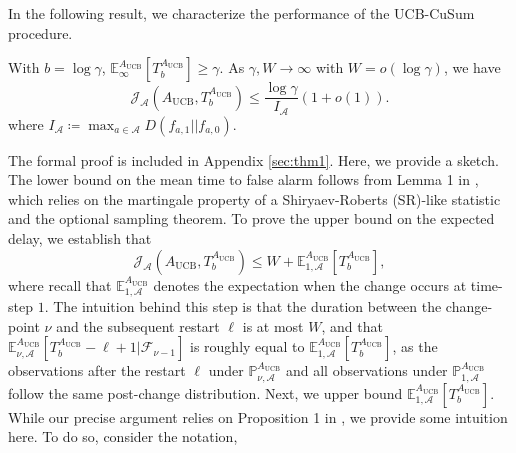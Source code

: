 \documentclass[letterpaper, 10 pt, conference]{ieeeconf}  %
\newcommand{\lp}{\left(}
\newcommand{\rp}{\right)}
\newcommand{\lb}{\left[}
\newcommand{\rb}{\right]}
\newcommand{\mcal}{\mathcal}
\newcommand{\mrm}{\mathrm}
\newcommand{\mbb}{\mathbb}
\newcommand{\E}{\mathbb{E}}
\begin{document}
In the following result, we characterize the performance of the UCB-CuSum procedure.
%
\begin{theorem}\label{thm:UCB_CuSum_opt}
With $b = \log \gamma$, $\E_{\infty}^{A_{\mrm{UCB}}} \lb T_{b}^{A_{\mrm{UCB}}} \rb \geq \gamma$. As $\gamma, W \to \infty$ with $W = o\lp \log \gamma \rp$, we have
%
\begin{equation}\label{eq:thm_WADD} \mcal{J}_{\mcal{A}} \!\lp \!A_{\mrm{UCB}}, T_{b}^{A_{\mrm{UCB}}} \!\rp \leq \frac{\log \gamma}{I_{\mcal{A}}} \lp 1 + o \lp 1\rp \rp.
\end{equation}
where $I_{\mcal{A}} \coloneqq \max_{a \in \mcal{A}} D\lp f_{a,1} || f_{a, 0} \rp$.
\end{theorem}
%
The formal proof is included in Appendix \ref{sec:thm1}. Here, we provide a sketch. 
The lower bound on the mean time to false alarm follows from Lemma 1 in \cite{veeravalli2024quickest}, which relies on the martingale property of a Shiryaev-Roberts (SR)-like statistic and the optional sampling theorem.
To prove the upper bound on the expected delay, we establish that 
%
\begin{equation}
    \mcal{J}_{\mcal{A}} \lp A_{\mrm{UCB}}, T_{b}^{A_{\mrm{UCB}}} \rp \leq W + \E_{1,\mcal{A}}^{A_{\mrm{UCB}}} \lb T_{b}^{A_{\mrm{UCB}}} \rb,
\end{equation}
%
where recall that $\E_{1,\mcal{A}}^{A_{\mrm{UCB}}}$ denotes the expectation when the change occurs at time-step $1$.
The intuition behind this step is that the duration between the change-point $\nu$ and the subsequent restart $\ell$ is at most $W$, and that $\E_{\nu,\mcal{A}}^{A_{\mrm{UCB}}} [T_{b}^{A_{\mrm{UCB}}} - \ell + 1 | \mcal{F}_{\nu-1}]$ is roughly equal to $\E_{1,\mcal{A}}^{A_{\mrm{UCB}}} [T_{b}^{A_{\mrm{UCB}}}]$, as the observations after the restart $\ell$ under $\mbb{P}_{\nu,\mcal{A}}^{A_{\mrm{UCB}}}$ and all observations under $\mbb{P}_{1,\mcal{A}}^{A_{\mrm{UCB}}}$ follow the same post-change distribution. Next, we upper bound $\E_{1,\mcal{A}}^{A_{\mrm{UCB}}} [T_{b}^{A_{\mrm{UCB}}} ]$. While our precise argument relies on
Proposition 1 in \cite{veeravalli2024quickest}, we provide some intuition here. To do so, consider the notation,
\end{document}
